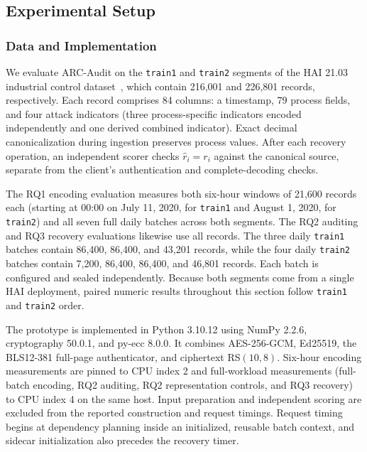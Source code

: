 \documentclass[10pt,journal]{IEEEtran}
\begin{document}
\subsection{Experimental Setup}
\subsubsection{Data and Implementation}
We evaluate ARC-Audit on the \texttt{train1} and \texttt{train2} segments of the HAI 21.03 industrial control dataset~\cite{Shin2021HAI}, which contain 216,001 and 226,801 records, respectively. Each record comprises 84 columns: a timestamp, 79 process fields, and four attack indicators (three process-specific indicators encoded independently and one derived combined indicator). Exact decimal canonicalization during ingestion preserves process values. After each recovery operation, an independent scorer checks $\widehat r_i=r_i$ against the canonical source, separate from the client's authentication and complete-decoding checks.

The RQ1 encoding evaluation measures both six-hour windows of 21,600 records each (starting at 00:00 on July 11, 2020, for \texttt{train1} and August 1, 2020, for \texttt{train2}) and all seven full daily batches across both segments. The RQ2 auditing and RQ3 recovery evaluations likewise use all records. The three daily \texttt{train1} batches contain 86,400, 86,400, and 43,201 records, while the four daily \texttt{train2} batches contain 7,200, 86,400, 86,400, and 46,801 records. Each batch is configured and sealed independently. Because both segments come from a single HAI deployment, paired numeric results throughout this section follow \texttt{train1} and \texttt{train2} order.

The prototype is implemented in Python 3.10.12 using NumPy 2.2.6, cryptography 50.0.1, and py-ecc 8.0.0. It combines AES-256-GCM, Ed25519, the BLS12-381 full-page authenticator, and ciphertext RS$(10,8)$. Six-hour encoding measurements are pinned to CPU index 2 and full-workload measurements (full-batch encoding, RQ2 auditing, RQ2 representation controls, and RQ3 recovery) to CPU index 4 on the same host. Input preparation and independent scoring are excluded from the reported construction and request timings. Request timing begins at dependency planning inside an initialized, reusable batch context, and sidecar initialization also precedes the recovery timer.
\end{document}
